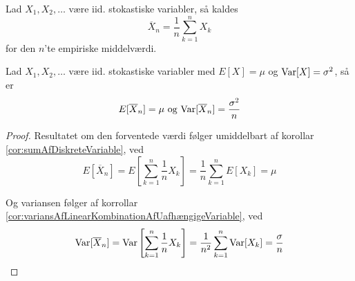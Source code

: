 \begin{definition}
  Lad $X_{1}, X_{2}, \ldots$ være iid. stokastiske variabler, så kaldes
  \[
    \overline{X}_{n} = \frac{1}{n} \sum_{k=1}^n X_{k}
  \]
  for den $n$'te empiriske middelværdi.
\end{definition}

\begin{lemma} \label{lem:variansOgForventedeVærdiAfEmpiriskMiddelværdi}
  Lad $X_{1}, X_{2}, \ldots$ være iid. stokastiske variabler med $E[X] = \mu$ og $\textnormal{Var}[X] = \sigma^{2}$, så er
  \begin{equation*}
    E[\overline{X}_{n}] = \mu \text{ og } \textnormal{Var}[\overline{X}_{n}] = \frac{\sigma^{2}}{n}
  \end{equation*}
\end{lemma}
\begin{proof}
  Resultatet om den forventede værdi følger umiddelbart af korollar \ref{cor:sumAfDiskreteVariable}, ved
  \begin{equation*}
    E[\overline{X}_{n}] = E \left[\sum^{n}_{k = 1} \frac{1}{n} X_{k}\right] = \frac{1}{n} \sum_{k=1}^{n} E[X_{k}] = \mu
  \end{equation*}

  Og variansen følger af korrollar \ref{cor:variansAfLinearKombinationAfUafhængigeVariable}, ved
  \begin{equation*}
    \textnormal{Var}[\overline{X}_{n}] = \textnormal{Var} \left[\sum^{n}_{k = 1} \frac{1}{n} X_{k}\right] = \frac{1}{n^{2}} \sum_{k=1}^{n} \textnormal{Var}[X_{k}] = \frac{\sigma}{n}
  \end{equation*}
\end{proof}

